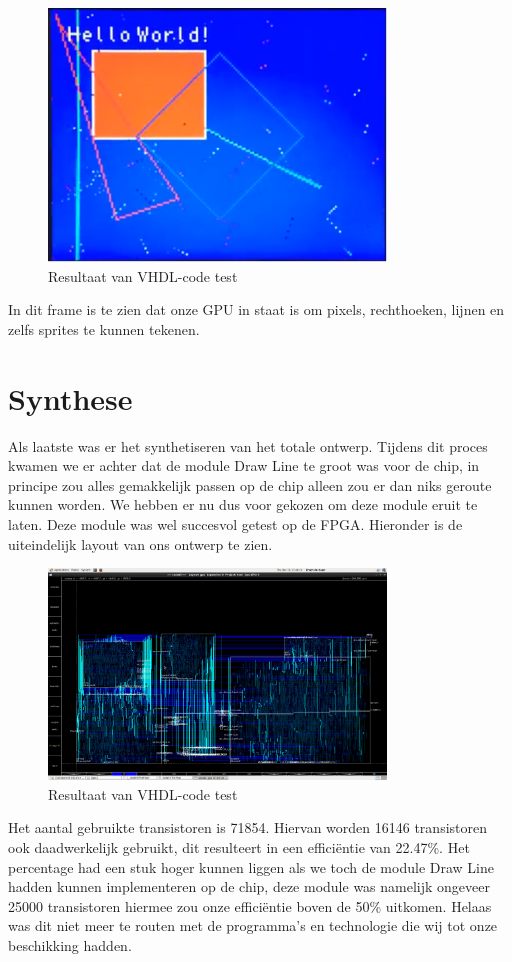 \documentclass{scrartcl} %
\begin{document}
\begin{figure}[H]
	\centering
	\includegraphics[width=0.8\textwidth]{FPGAtest}
	\caption{Resultaat van VHDL-code test}
\end{figure}

In dit frame is te zien dat onze GPU in staat is om pixels, rechthoeken, lijnen en zelfs sprites te kunnen tekenen.


\section{Synthese}

Als laatste was er het synthetiseren van het totale ontwerp. Tijdens dit proces kwamen we er achter dat de module Draw Line te groot was voor de chip, in principe zou alles gemakkelijk passen op de chip alleen zou er dan niks geroute kunnen worden. We hebben er nu dus voor gekozen om deze module eruit te laten. Deze module was wel succesvol getest op de FPGA. Hieronder is de uiteindelijk layout van ons ontwerp te zien.


\begin{figure}[H]
	\centering
	\includegraphics[width=0.8\textwidth]{layout}
	\caption{Resultaat van VHDL-code test}
\end{figure}

Het aantal gebruikte transistoren is 71854. Hiervan worden 16146 transistoren ook daadwerkelijk gebruikt, dit resulteert in een efficiëntie van 22.47\%. Het percentage had een stuk hoger kunnen liggen als we toch de module Draw Line hadden kunnen implementeren op de chip, deze module was namelijk ongeveer 25000 transistoren hiermee zou onze efficiëntie boven de 50\% uitkomen. Helaas was dit niet meer te routen met de programma's en technologie die wij tot onze beschikking hadden.
\end{document}
